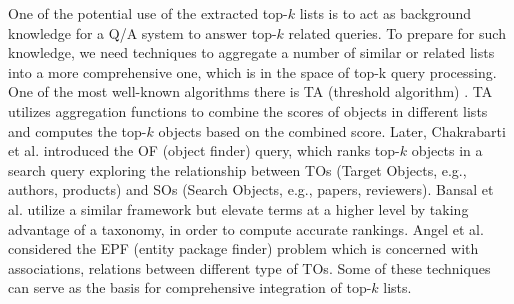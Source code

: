 One of the potential use of the extracted top-$k$ lists
is to act as background knowledge for a Q/A system\cite{cao2012approaches} to answer
top-$k$ related queries. To prepare for such knowledge, we need techniques
to aggregate a number of similar or related lists into a more comprehensive
one, which is in the space of top-k query processing.
One of the most well-known algorithms there is
TA (threshold algorithm) \cite{fagin2001optimal,guntzer2000optimizing}.
TA utilizes aggregation functions
to combine the scores of objects in different
lists and computes the top-$k$ objects based on the combined score.
Later, Chakrabarti et al. \cite{chakrabarti2006ranking} introduced the
OF (object finder) query,
which ranks top-$k$ objects in a search query
exploring the relationship between TOs (Target Objects, e.g., authors, products)
and SOs (Search Objects, e.g., papers, reviewers).
Bansal et al.\cite{bansal2008ad} utilize a similar framework but
elevate terms at a higher level by taking advantage of a taxonomy,
in order to compute accurate rankings.
Angel et al.\cite{angel2009ranking} considered
the EPF (entity package finder) problem which is concerned with
associations, relations between different type of TOs.
Some of these techniques can serve as the basis for comprehensive integration of
top-$k$ lists.


